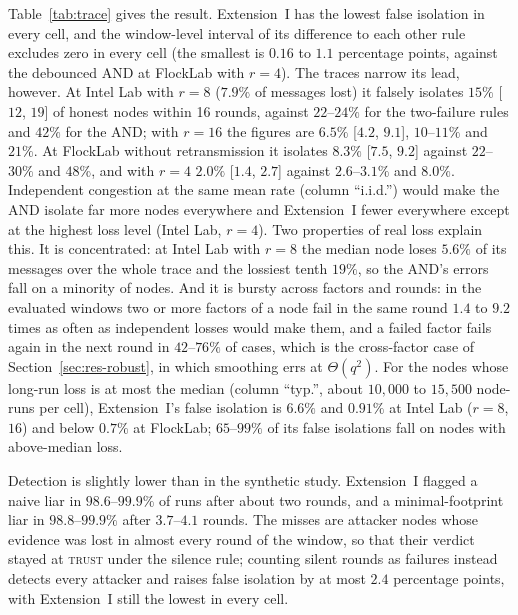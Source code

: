 \documentclass{ieeeaccess}
\begin{document}
Table~\ref{tab:trace} gives the result.  Extension~I has the lowest
false isolation in every cell, and the window-level interval of its
difference to each other rule excludes zero in every cell (the
smallest is $0.16$ to $1.1$ percentage points, against the debounced
AND at FlockLab with $r=4$).  The traces narrow its lead, however.  At
Intel Lab with $r=8$ ($7.9\%$ of messages lost) it falsely isolates
$15\%$ [$12$, $19$] of honest nodes within 16 rounds, against
$22$--$24\%$ for the two-failure rules and $42\%$ for the AND; with
$r=16$ the figures are $6.5\%$ [$4.2$, $9.1$], $10$--$11\%$ and $21\%$.
At FlockLab without retransmission it isolates $8.3\%$ [$7.5$, $9.2$]
against $22$--$30\%$ and $48\%$, and with $r=4$ $2.0\%$ [$1.4$, $2.7$]
against $2.6$--$3.1\%$ and $8.0\%$.  Independent congestion at the same
mean rate (column ``i.i.d.'') would make the AND isolate far more nodes
everywhere and Extension~I fewer everywhere except at the highest loss
level (Intel Lab, $r=4$).  Two properties of real loss explain this.
It is concentrated: at Intel Lab with $r=8$ the median node loses
$5.6\%$ of its messages over the whole trace and the lossiest tenth
$19\%$, so the AND's errors fall on a minority of nodes.  And it is
bursty across factors and rounds: in the evaluated windows two or more
factors of a node fail in the same round $1.4$ to $9.2$ times as often
as independent losses would make them, and a failed factor fails again
in the next round in $42$--$76\%$ of cases, which is the cross-factor
case of Section~\ref{sec:res-robust}, in which smoothing errs at
$\Theta(q^{2})$.  For the nodes whose long-run loss is at most the
median (column ``typ.'', about $10{,}000$ to $15{,}500$ node-runs per
cell), Extension~I's false isolation is $6.6\%$ and $0.91\%$ at Intel
Lab ($r=8$, $16$) and below $0.7\%$ at FlockLab; $65$--$99\%$ of its
false isolations fall on nodes with above-median loss.

Detection is slightly lower than in the synthetic study.  Extension~I
flagged a naive liar in $98.6$--$99.9\%$ of runs after about two rounds,
and a minimal-footprint liar in $98.8$--$99.9\%$ after $3.7$--$4.1$
rounds.  The misses are attacker nodes whose evidence was lost in
almost every round of the window, so that their verdict stayed at
\textsc{trust} under the silence rule; counting silent rounds as
failures instead detects every attacker and raises false isolation by
at most $2.4$ percentage points, with Extension~I still the lowest in
every cell.
\end{document}
